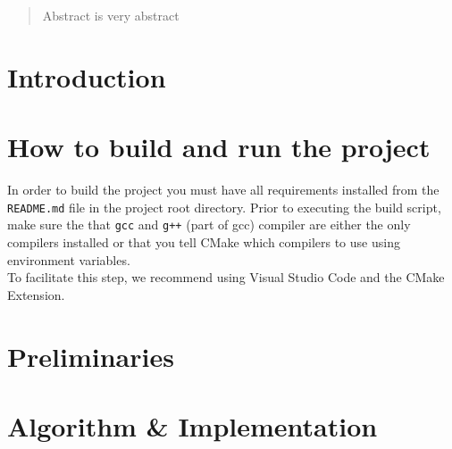 \documentclass[twocolumn]{article}
\begin{document}


\begin{abstract}
    Abstract is very abstract
\end{abstract}


\section{Introduction}

\section{How to build and run the project}

In order to build the project you must have all requirements installed from the \texttt{README.md} file in the project root directory.
Prior to executing the build script, make sure the that \texttt{gcc} and \texttt{g++} (part of gcc) compiler are either the only compilers installed or that you tell CMake which compilers to use using environment variables.\\
To facilitate this step, we recommend using Visual Studio Code and the CMake Extension.

\section{Preliminaries}


\section{Algorithm \& Implementation}
\end{document}
